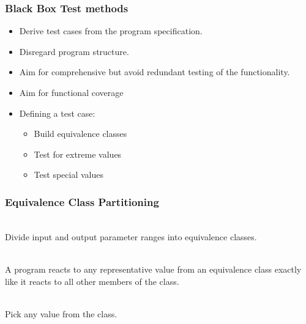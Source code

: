 %
%
%


\begin{frame}
\frametitle{Black Box Test methods}
\begin{itemize}
  \item Derive test cases from the program specification.
  \item Disregard program structure.
  \item Aim for comprehensive but avoid redundant testing of the functionality.
  \item Aim for functional coverage
  \item Defining a test case: 
    \begin{itemize}
      \item Build equivalence classes
      \item Test for extreme values
      \item Test special values
    \end{itemize}
\end{itemize}
\end{frame}


\begin{frame}
\frametitle{Equivalence Class Partitioning}
\\
Divide input and output parameter ranges into equivalence classes.
 
\vspace{\baselineskip}
\\
A program reacts to any representative value from an equivalence class exactly like it reacts to all other members of the class.
 
\vspace{\baselineskip}
\\
Pick any value from the class.
\end{frame}

